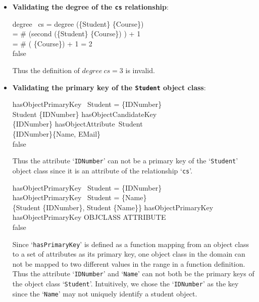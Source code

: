 \documentclass{entcs}
\begin{document}
\begin{itemize}
    \item{\bf Validating the degree of the \texttt{cs} relationship}:
    \begin{small}
    \begin{zed}
      degree~ cs = degree (\{Student\} \mapsto  \langle
      \{Course\}\rangle) \\
       = \# (second (\{Student\} \mapsto  \langle
      \{Course\}\rangle) ) + 1 \\
      = \# (\langle
      \{Course\}\rangle) + 1 = 2 \\
       \implies false
    \end{zed}
    \end{small}
    Thus the definition of $degree~ cs = 3$ is invalid.
    \item {\bf Validating the primary key of the \texttt{Student} object class}:
     \begin{small}
     \begin{zed}
      hasObjectPrimaryKey~ Student = \{IDNumber\} \\
      \implies
      Student \mapsto \{IDNumber\} \in hasObjectCandidateKey \\
       \implies \{IDNumber\} \subseteq hasObjectAttribute~Student\\
       \implies
      \{IDNumber\}\subseteq  \{Name, EMail\} \\
       \implies false
    \end{zed}
    \end{small}
     Thus the attribute `\texttt{IDNumber}' can not be a primary key of the
     `\texttt{Student}' object class since it is an attribute of the
     relationship `\texttt{cs}'.
      \begin{small}
      \begin{zed}
      hasObjectPrimaryKey~ Student = \{IDNumber\} \\
      \land hasObjectPrimaryKey~ Student =
      \{Name\}\\
       \implies \{Student \mapsto \{IDNumber\}, Student \mapsto \{Name\}\}
      \subseteq hasObjectPrimaryKey \\
       \land hasObjectPrimaryKey \subseteq OBJCLASS \fun \power
      ATTRIBUTE\\
       \implies false
    \end{zed}
    \end{small}
     Since `\texttt{hasPrimaryKey}' is defined as a function mapping from
     an object class to a set of attributes as its primary key, one object class in
     the domain can not be mapped to two different values in the range in a
     function definition. Thus the attribute `\texttt{IDNumber}' and
     `\texttt{Name}' can not both be the primary
     keys of the object class `\texttt{Student}'. Intuitively, we
     chose the `\texttt{IDNumber}' as the key since the
     `\texttt{Name}' may not uniquely identify a student object.
\end{itemize}
\end{document}
